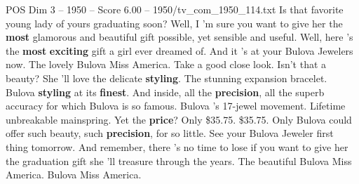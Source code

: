 \begin{textsample}{POS Dim 3 – 1950 – Score 6.00 – 1950/tv\_com\_1950\_114.txt}  \label{ex:f3_pos_008}
Is that favorite young lady of yours graduating soon?
Well, I 'm sure you want to give her the \textbf{most} glamorous and beautiful gift possible, yet sensible and useful.
Well, here 's the \textbf{most} \textbf{exciting} gift a girl ever dreamed of.
And it 's at your Bulova Jewelers now.
The lovely Bulova Miss America.
Take a good close look.
Isn't that a beauty?
She 'll love the delicate \textbf{styling}.
The stunning expansion bracelet.
Bulova \textbf{styling} at its \textbf{finest}.
And inside, all the \textbf{precision}, all the superb accuracy for which Bulova is so famous.
Bulova 's 17-jewel movement.
Lifetime unbreakable mainspring.
Yet the \textbf{price}?
Only \$35.75. \$35.75.
Only Bulova could offer such beauty, such \textbf{precision}, for so little.
See your Bulova Jeweler first thing tomorrow.
And remember, there 's no time to lose if you want to give her the graduation gift she 'll treasure through the years.
The beautiful Bulova Miss America.
Bulova Miss America.

\end{textsample}
